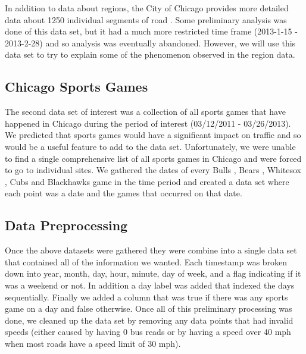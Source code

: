 \documentclass[12pt]{article}
\begin{document}
In addition to data about regions, the City of Chicago provides more detailed data about 1250 individual segments of road \cite{segmentdataset}. Some preliminary analysis was done of this data set, but it had a much more restricted time frame (2013-1-15 - 2013-2-28) and so analysis was eventually abandoned. However, we will use this data set to try to explain some of the phenomenon observed in the region data.
\subsection{Chicago Sports Games}
The second data set of interest was a collection of all sports games that have happened in Chicago during the period of interest (03/12/2011 - 03/26/2013). We predicted that sports games would have a significant impact on traffic and so would be a useful feature to add to the data set. Unfortunately, we were unable to find a single comprehensive list of all sports games in Chicago and were forced to go to individual sites. We gathered the dates of every Bulls \cite{bullsdata}, Bears \cite{bearsdata}, Whitesox \cite{whitesoxdata}, Cubs \cite{cubsdata} and Blackhawks \cite{blackhawksdata} game in the time period and created a data set where each point was a date and the games that occurred on that date.
\subsection{Data Preprocessing}
Once the above datasets were gathered they were combine into a single data set that contained all of the information we wanted. Each timestamp was broken down into year, month, day, hour, minute, day of week, and a flag indicating if it was a weekend or not. In addition a day label was added that indexed the days sequentially. Finally we added a column that was true if there was any sports game on a day and false otherwise. Once all of this preliminary processing was done, we cleaned up the data set by removing any data points that had invalid speeds (either caused by having 0 bus reads or by having a speed over 40 mph when most roads have a speed limit of 30 mph). 
\end{document}
